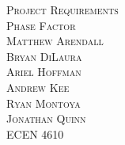 \begin{titlepage}
\begin{center} 
\vspace*{2cm}
\textsc{\huge Project Requirements}\\[1cm]
\textsc{\LARGE Phase Factor}\\[9cm]

\textsc{\large Matthew Arendall}\\[0.2cm]
\textsc{\large Bryan DiLaura} \\[0.2cm]
\textsc{\large Ariel Hoffman} \\[0.2cm]
\textsc{\large Andrew Kee} \\[0.2cm]
\textsc{\large Ryan Montoya} \\[0.2cm]
\textsc{\large Jonathan Quinn} \\[0.2cm]
\textsc{ECEN 4610}

\end{center}
\end{titlepage}